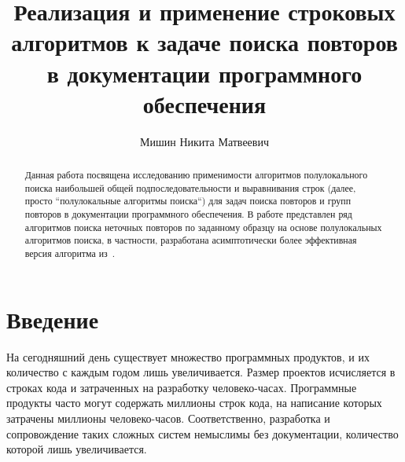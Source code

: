 \def\mcirc{\mathbin{\scalerel*{\circ}{j}}}
\def\msquare{\mathord{\scalerel*{\Box}{gX}}}


\title{Реализация и применение строковых алгоритмов к задаче поиска
повторов в документации программного обеспечения}


\author{Мишин Никита Матвеевич}



\maketitle


\begin{abstract}
Данная работа посвящена исследованию применимости алгоритмов полулокального поиска наибольшей общей подпоследовательности и выравнивания строк (далее, просто ``полулокальные алгоритмы поиска``) для задач поиска повторов и групп повторов в документации программного обеспечения.
В работе представлен ряд алгоритмов поиска неточных повторов по заданному образцу на основе полулокальных алгоритмов поиска, в частности, разработана асимптотически более эффективная версия алгоритма из~\cite{luciv2019interactive}.
\end{abstract}

\section*{Введение}

На сегодняшний день существует множество программных продуктов, и их количество с каждым годом лишь увеличивается.
Размер проектов исчисляется в строках кода и затраченных на разработку человеко-часах.
Программные продукты часто могут содержать миллионы строк кода, на написание которых затрачены миллионы человеко-часов.
Соответственно, разработка и сопровождение таких сложных систем немыслимы без документации, количество которой лишь увеличивается.

